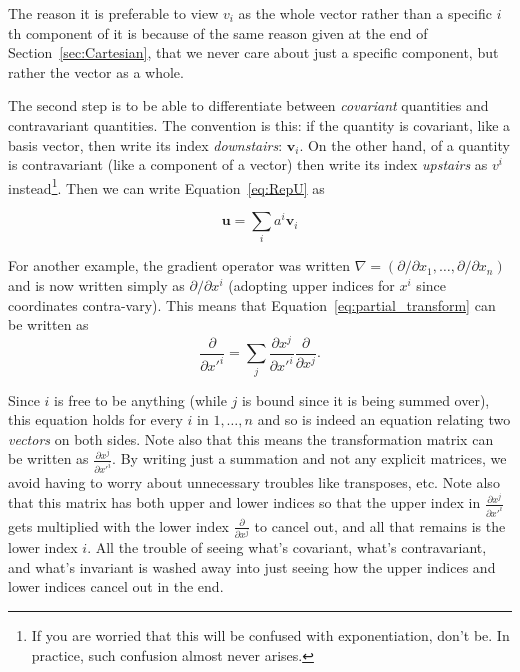 \documentclass[../master.tex]{subfiles}
\begin{document}
	The reason it is preferable to view $v_i$ as the whole vector rather than a specific $i$th component of it is because of the same reason given at the end of Section~\ref{sec:Cartesian}, that we never care about just a specific component, but rather the vector as a whole. 
	
	The second step is to be able to differentiate between \emph{covariant} quantities and contravariant quantities. The convention is this: if the quantity is covariant, like a basis vector, then write its index \emph{downstairs}: $\mathbf v_i$. On the other hand, of a quantity is contravariant (like a component of a vector) then write its index \emph{upstairs} as $v^i$ instead\footnote{If you are worried that this will be confused with exponentiation, don't be. In practice, such confusion almost never arises.}. Then we can write Equation~\eqref{eq:RepU} as 
	
	\begin{equation}
		\mathbf u = \sum_{i} a^i \mathbf v_i
	\end{equation}
	
	For another example, the gradient operator was written $\nabla = (\partial/\partial x_1, \dots, \partial/\partial x_n)$ and is now written simply as $\partial/\partial x^i$ (adopting upper indices for $x^i$ since coordinates contra-vary). This means that Equation~\eqref{eq:partial_transform} can be written as
	\begin{equation}\label{eq:partial_transform2}
		\frac{\partial}{\partial {x'}^i} = \sum_{j} \frac{\partial x^j}{\partial {x'}^i} \frac{\partial}{\partial x^j}.
	\end{equation}
	
	Since $i$ is free to be anything (while $j$ is bound since it is being summed over), this equation holds for every $i$ in $1,\dots, n$ and so is indeed an equation relating two \emph{vectors} on both sides. Note also that this means the transformation matrix can be written as $\frac{\partial x^j}{\partial {x'}^i}$. By writing just a summation and not any explicit matrices, we avoid having to worry about unnecessary troubles like transposes, etc. Note also that this matrix has both upper and lower indices so that the upper index in $\frac{\partial x^j}{\partial {x'}^i}$ gets multiplied with the lower index $\frac{\partial}{\partial x^j}$ to cancel out, and all that remains is the lower index $i$. All the trouble of seeing what's covariant, what's contravariant, and what's invariant is washed away into just seeing how the upper indices and lower indices cancel out in the end.
	
\end{document}
